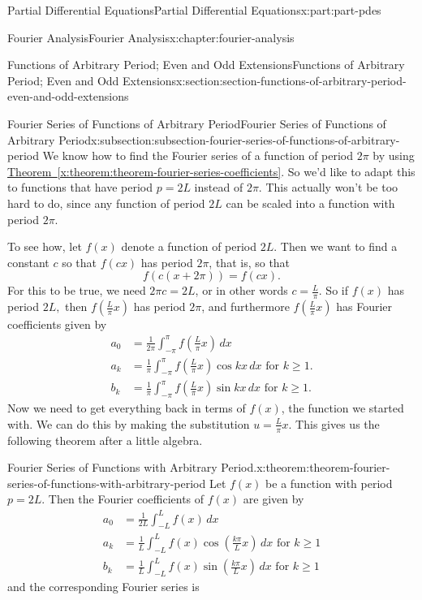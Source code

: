 \documentclass[oneside,10pt,]{book}
\newcommand{\xreffont}{\relax}
\numberwithin{equation}{part}
\newcommand{\amp}{&}
\begin{document}
\begin{partptx}{Partial Differential Equations}{}{Partial Differential Equations}{}{}{x:part:part-pdes}
\begin{chapterptx}{Fourier Analysis}{}{Fourier Analysis}{}{}{x:chapter:fourier-analysis}
\begin{sectionptx}{Functions of Arbitrary Period; Even and Odd Extensions}{}{Functions of Arbitrary Period; Even and Odd Extensions}{}{}{x:section:section-functions-of-arbitrary-period-even-and-odd-extensions}
\begin{subsectionptx}{Fourier Series of Functions of Arbitrary Period}{}{Fourier Series of Functions of Arbitrary Period}{}{}{x:subsection:subsection-fourier-series-of-functions-of-arbitrary-period}
We know how to find the Fourier series of a function of period \(2\pi\) by using \hyperref[x:theorem:theorem-fourier-series-coefficients]{Theorem~{\xreffont\ref{x:theorem:theorem-fourier-series-coefficients}}}. So we'd like to adapt this to functions that have period \(p = 2L\) instead of \(2\pi\). This actually won't be too hard to do, since any function of period \(2L\) can be scaled into a function with period \(2\pi\).%
\par
To see how, let \(f(x)\) denote a function of period \(2L\). Then we want to find a constant \(c\) so that \(f(cx)\) has period \(2\pi\), that is, so that%
\begin{equation*}
f(c(x+2\pi)) = f(cx).
\end{equation*}
For this to be true, we need \(2\pi c = 2L\), or in other words \(c = \frac{L}{\pi}\). So if \(f(x)\) has period \(2L,\) then \(f(\frac{L}{\pi}x)\) has period \(2\pi\), and furthermore \(f(\frac{L}{\pi}x)\) has Fourier coefficients given by%
\begin{align*}
a_{0} \amp= \frac{1}{2\pi}\int_{-\pi}^{\pi}f\left(\frac{L}{\pi}x\right)\,dx\\
a_{k} \amp= \frac{1}{\pi}\int_{-\pi}^{\pi}f\left(\frac{L}{\pi}x\right)\cos kx\,dx\text{ for $k\geq1$.}\\
b_{k} \amp= \frac{1}{\pi}\int_{-\pi}^{\pi}f\left(\frac{L}{\pi}x\right)\sin kx\,dx\text{ for $k\geq1$.}
\end{align*}
Now we need to get everything back in terms of \(f(x)\), the function we started with. We can do this by making the substitution \(u = \frac{L}{\pi}x\). This gives us the following theorem after a little algebra.%
\begin{theorem}{Fourier Series of Functions with Arbitrary Period.}{}{x:theorem:theorem-fourier-series-of-functions-with-arbitrary-period}%
%
Let \(f(x)\) be a function with period \(p = 2L\). Then the Fourier coefficients of \(f(x)\) are given by%
\begin{align*}
a_{0} \amp= \frac{1}{2L}\int_{-L}^{L}f\left(x\right)\,dx\\
a_{k} \amp= \frac{1}{L}\int_{-L}^{L}f\left(x\right)\cos\left(\frac{k\pi}{L}x\right)\,dx\text{ for $k\geq1$}\\
b_{k} \amp= \frac{1}{L}\int_{-L}^{L}f\left(x\right)\sin\left(\frac{k\pi}{L}x\right)\,dx\text{ for $k\geq1$}
\end{align*}
and the corresponding Fourier series is%
\begin{equation*}

\end{equation*}
\end{theorem}
\end{subsectionptx}
\end{sectionptx}
\end{chapterptx}
\end{partptx}
\end{document}
